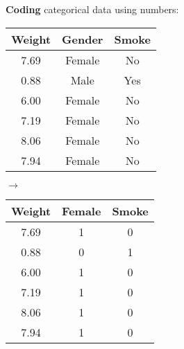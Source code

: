 \documentclass[../mathNotesPreamble]{subfiles}
\begin{document}
  \textbf{Coding} categorical data using numbers:
  \begin{center}
    \begin{tabular}{@{}ccc@{}}\toprule
      Weight & Gender & Smoke\\\midrule
      7.69 & Female & No\\
      0.88 & Male & Yes\\
      6.00 & Female & No\\
      7.19 & Female & No\\
      8.06 & Female & No\\
      7.94 & Female & No\\\bottomrule
    \end{tabular}
    \hspace*{10mm}$\longrightarrow$\hspace*{10mm}
    \begin{tabular}{@{}ccc@{}}\toprule
      Weight & Female & Smoke \\\midrule
      7.69 & 1 & 0\\
      0.88 & 0 & 1\\
      6.00 & 1 & 0\\
      7.19 & 1 & 0\\
      8.06 & 1 & 0\\
      7.94 & 1 & 0\\\bottomrule
    \end{tabular}
  \end{center}
  
\end{document}
